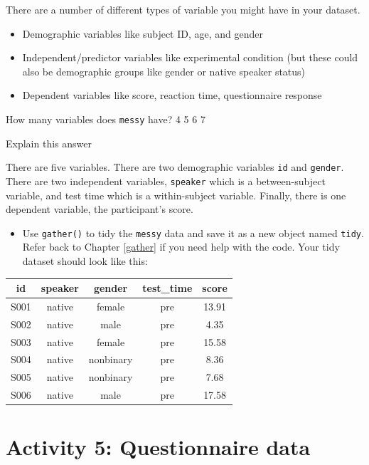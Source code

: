 \documentclass[]{book}
\providecommand{\tightlist}{%
  \setlength{\itemsep}{0pt}\setlength{\parskip}{0pt}}
\begin{document}
There are a number of different types of variable you might have in your dataset.

\begin{itemize}
\tightlist
\item
  Demographic variables like subject ID, age, and gender\\
\item
  Independent/predictor variables like experimental condition (but these could also be demographic groups like gender or native speaker status)\\
\item
  Dependent variables like score, reaction time, questionnaire response
\end{itemize}

How many variables does \texttt{messy} have? 4 5 6 7

Explain this answer

There are five variables. There are two demographic variables \texttt{id} and \texttt{gender}. There are two independent variables, \texttt{speaker} which is a between-subject variable, and test time which is a within-subject variable. Finally, there is one dependent variable, the participant's score.

\begin{itemize}
\tightlist
\item
  Use \texttt{gather()} to tidy the \texttt{messy} data and save it as a new object named \texttt{tidy}. Refer back to Chapter \ref{gather} if you need help with the code. Your tidy dataset should look like this:
\end{itemize}

\begin{tabular}{c|c|c|c|c}
\hline
id & speaker & gender & test\_time & score\\
\hline
S001 & native & female & pre & 13.91\\
\hline
S002 & native & male & pre & 4.35\\
\hline
S003 & native & female & pre & 15.58\\
\hline
S004 & native & nonbinary & pre & 8.36\\
\hline
S005 & native & nonbinary & pre & 7.68\\
\hline
S006 & native & male & pre & 17.58\\
\hline
\end{tabular}

\hypertarget{activity-5-questionnaire-data}{%
\section{Activity 5: Questionnaire data}\label{activity-5-questionnaire-data}}
\end{document}
